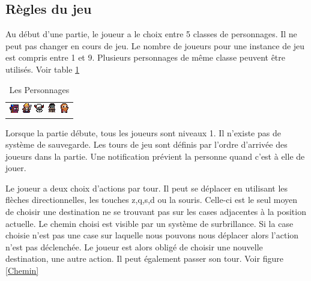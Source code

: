 \documentclass[a4paper, 12pt, twoside]{article}
\begin{document}
\subsection{Règles du jeu}
Au début d'une partie, le joueur a le choix entre 5 classes de personnages. Il ne peut pas changer en cours de jeu. Le nombre de joueurs pour une instance de jeu est compris entre 1 et 9. Plusieurs personnages de même classe peuvent être utilisés. Voir table \ref{perso}
\begin{table}[h]
\begin{center}
\begin{tabular}{  c  }
    \includegraphics[scale=3]{Players/Magus}
    \includegraphics[scale=2.2]{Players/WarriorNew} 
    \includegraphics[scale=2.2]{Players/Rogue} 
    \includegraphics[scale=2.2]{Players/Ranger} 
    \includegraphics[scale=2.2]{Players/Healer}
\end{tabular}
\caption{Les Personnages}
\label{perso}
\end{center}
\end{table}
Lorsque la partie débute, tous les joueurs sont niveaux 1. Il n'existe pas de système de sauvegarde. Les tours de jeu sont définis par l'ordre d'arrivée des joueurs dans la partie. Une notification prévient la personne quand c'est à elle de jouer.\\\par
Le joueur a deux choix d'actions par tour. Il peut se déplacer en utilisant les flèches directionnelles, les touches z,q,s,d ou la souris. Celle-ci est le seul moyen de choisir une destination ne se trouvant pas sur les cases adjacentes à la position actuelle. Le chemin choisi est visible par un système de surbrillance. Si la case choisie n'est pas une case sur laquelle nous pouvons nous déplacer alors l'action n'est pas déclenchée. Le joueur est alors obligé de choisir une nouvelle destination, une autre action. Il peut également passer son tour. Voir figure \ref{Chemin}
\end{document}
